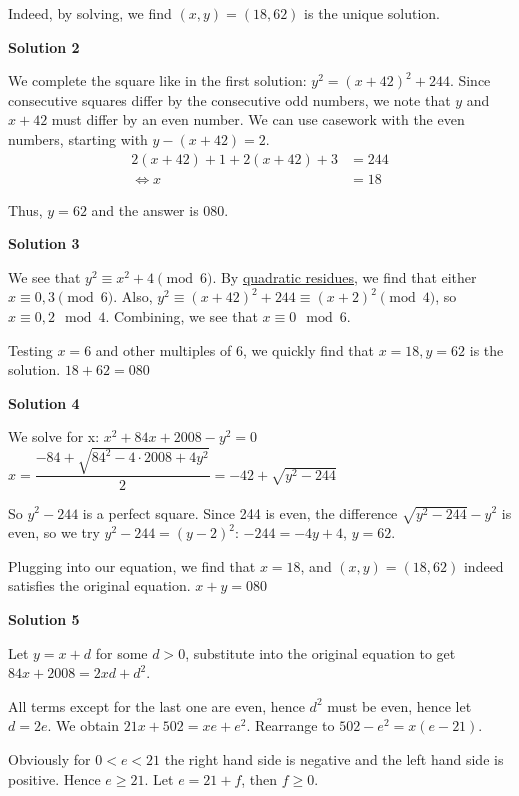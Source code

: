\begin{enumerate}
 Indeed, by solving, we find $(x,y) = (18,62)$ is the unique solution. 

 



\textbf{Solution 2}

We complete the square like in the first solution: $y^2 = (x+42)^2 + 244$. Since consecutive squares differ by the consecutive odd numbers, we note that $y$ and $x+42$ must differ by an even number. We can use casework with the even numbers, starting with $y-(x+42)=2$.
 \begin{align*}2(x+42)+1+2(x+42)+3&=244\\ \Leftrightarrow x&=18\end{align*}


 Thus, $y=62$ and the answer is $\boxed{080}$.

 



\textbf{Solution 3}

We see that $y^2 \equiv x^2 + 4 \pmod{6}$. By \href{https://artofproblemsolving.com/wiki/index.php?title=Quadratic\_residue}{quadratic residues}, we find that either $x \equiv 0, 3 \pmod{6}$. Also, $y^2 \equiv (x+42)^2 + 244 \equiv (x+2)^2 \pmod{4}$, so $x \equiv 0, 2 \mod{4}$. Combining, we see that $x \equiv 0 \mod{6}$. 

 Testing $x = 6$ and other multiples of $6$, we quickly find that $x = 18, y = 62$ is the solution. $18+62=\boxed{080}$




\textbf{Solution 4}

We solve for x: $x^2 + 84x + 2008-y^2 = 0$
$x=\dfrac{-84+\sqrt{84^2-4\cdot 2008+4y^2}}{2}=-42+\sqrt{y^2-244}$

 So $y^2-244$ is a perfect square. Since 244 is even, the difference $\sqrt{y^2-244} -y^2$ is even, so we try $y^2-244=(y-2)^2$: $-244=-4y+4$, $y=62$.

 Plugging into our equation, we find that $x=18$, and $(x,y)=(18,62)$ indeed satisfies the original equation. $x+y=\boxed{080}$




\textbf{Solution 5}

Let $y=x+d$ for some $d>0$, substitute into the original equation to get $84x + 2008 = 2xd + d^2$.

 All terms except for the last one are even, hence $d^2$ must be even, hence let $d=2e$. We obtain $21x + 502 = xe + e^2$. Rearrange to $502-e^2 = x(e-21)$.

 Obviously for $0<e<21$ the right hand side is negative and the left hand side is positive. Hence $e\geq 21$. Let $e=21+f$, then $f\geq 0$.


\end{enumerate}
